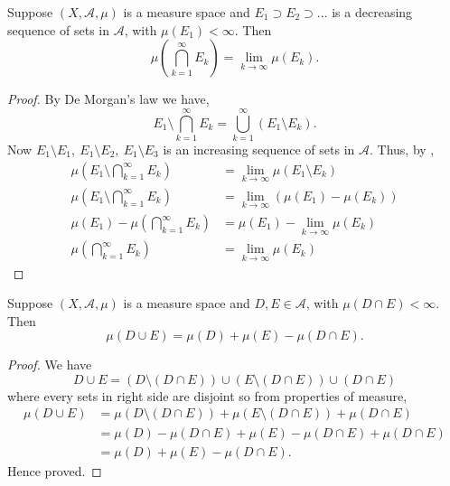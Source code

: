 \begin{theorem}[]
    Suppose $(X,\mathcal{A},\mu)$ is a measure space and $E_1\supset E_2\supset\ldots$ is a decreasing sequence of sets in $\mathcal{A}$, with $\mu(E_1)<\infty$. Then
    \[
        \mu\left( \bigcap_{k=1}^{\infty}E_k \right) = \lim_{k\to\infty}\mu(E_k).
    \]
\end{theorem}
\begin{proof}
    By De Morgan's law we have,
    \[
        E_1\setminus \bigcap_{k=1}^{\infty}E_k = \bigcup_{k=1}^{\infty}(E_1\setminus E_k).
    \]
    Now $E_1\setminus E_1,\ E_1\setminus E_2,\ E_1\setminus E_3$ is an increasing sequence of sets in $\mathcal{A}$.
    Thus, by ,
    \begin{align*}
        \mu\left(E_1\setminus \bigcap_{k=1}^{\infty}E_k\right) &= \lim_{k\to\infty}\mu(E_1\setminus E_k)\\
        \mu\left(E_1\setminus \bigcap_{k=1}^{\infty}E_k\right) &= \lim_{k\to\infty}\left( \mu(E_1)-\mu(E_k) \right) \\
        \mu(E_1)-\mu\left( \bigcap_{k=1}^{\infty}E_k \right) &= \mu(E_1)-\lim_{k\to\infty}\mu(E_k)\\
        \mu\left( \bigcap_{k=1}^{\infty}E_k \right) &= \lim_{k\to\infty}\mu(E_k)
    \end{align*}
\end{proof}
\begin{theorem}
    Suppose $(X,\mathcal{A},\mu)$ is a measure space and $D,E\in\mathcal{A}$, with $\mu(D\cap E)<\infty$. Then
    \[
         \mu(D\cup E)=\mu(D)+\mu(E)-\mu(D\cap E).
    \]
\end{theorem}
\begin{center}
\end{center}
\begin{proof}
    We have 
    \[
        D\cup E=(D\setminus (D\cap E))\cup(E\setminus (D\cap E))\cup(D\cap E)
    \]
    where every sets in right side are disjoint so from properties of measure,
    \begin{align*}
        \mu(D\cup E)&=\mu(D\setminus (D\cap E)) + \mu(E\setminus (D\cap E)) + \mu(D\cap E)\\
                    &=\mu(D) - \mu(D\cap E) + \mu(E) - \mu(D\cap E) + \mu(D\cap E)\\
                    &=\mu(D)+\mu(E)-\mu(D\cap E).
    \end{align*}
    Hence proved.
\end{proof}
